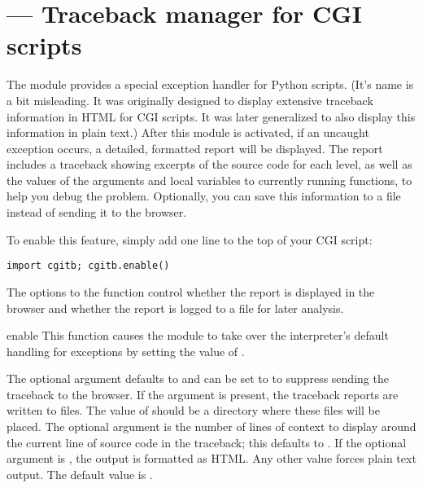 \section{ ---
         Traceback manager for CGI scripts}



The  module provides a special exception handler for Python
scripts.  (It's name is a bit misleading.  It was originally designed to
display extensive traceback information in HTML for CGI scripts.  It was
later generalized to also display this information in plain text.)  After
this module is activated, if an uncaught exception occurs, a detailed,
formatted report will be displayed.  The report
includes a traceback showing excerpts of the source code for each level,
as well as the values of the arguments and local variables to currently
running functions, to help you debug the problem.  Optionally, you can
save this information to a file instead of sending it to the browser.

To enable this feature, simply add one line to the top of your CGI script:

\begin{verbatim}
import cgitb; cgitb.enable()
\end{verbatim}

The options to the  function control whether the
report is displayed in the browser and whether the report is logged
to a file for later analysis.


\begin{funcdesc}{enable}{}
  This function causes the  module to take over the
  interpreter's default handling for exceptions by setting the
  value of .

  The optional argument  defaults to  and can be set
  to  to suppress sending the traceback to the browser.
  If the argument  is present, the traceback reports are
  written to files.  The value of  should be a directory
  where these files will be placed.
  The optional argument  is the number of lines of
  context to display around the current line of source code in the
  traceback; this defaults to .
  If the optional argument  is , the output is
  formatted as HTML.  Any other value forces plain text output.  The default
  value is .
\end{funcdesc}

